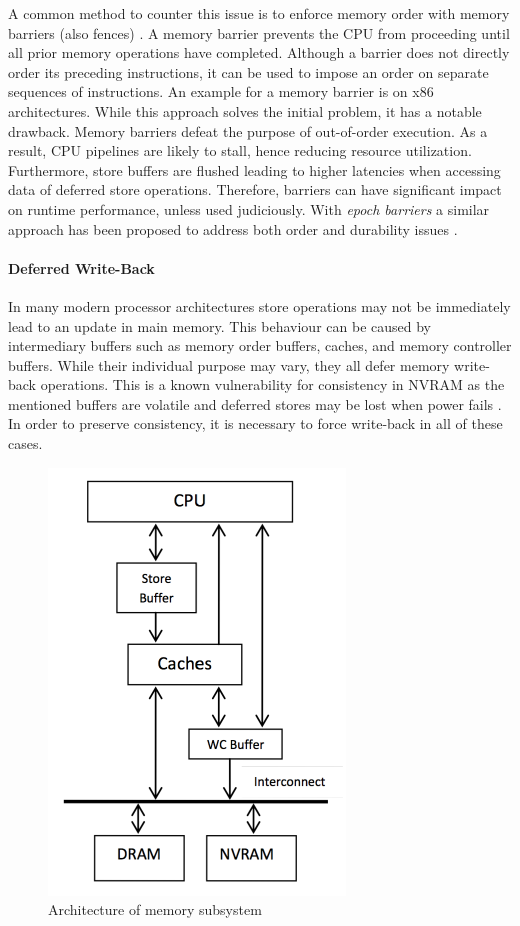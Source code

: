 A common method to counter this issue is to enforce memory order with memory
barriers (also fences) \cite{dulloor2014system, schwalb2016hyrise,
oukid2017data}. A memory barrier prevents the CPU from proceeding until all
prior memory operations have completed. Although a barrier does not directly
order its preceding instructions, it can be used to impose an order on separate
sequences of instructions. An example for a memory barrier is  on
x86 architectures. While this approach solves the initial problem, it has a
notable drawback. Memory barriers defeat the purpose of out-of-order execution.
As a result, CPU pipelines are likely to stall, hence reducing resource
utilization. Furthermore, store buffers are flushed leading to higher latencies
when accessing data of deferred store operations. Therefore, barriers can have
significant impact on runtime performance, unless used judiciously. With
\emph{epoch barriers} a similar approach has been proposed to address both order
and durability issues \cite{condit2009better}.

\paragraph{Deferred Write-Back}

In many modern processor architectures store operations may not  be immediately
lead to an update in main memory. This behaviour can be caused by intermediary
buffers such as memory order buffers, caches, and memory controller buffers.
While their individual purpose may vary, they all defer memory write-back
operations. This is a known vulnerability for consistency in NVRAM as the
mentioned buffers are volatile and deferred stores may be lost when power fails
\cite{condit2009better, oukid2017data}. In order to preserve consistency, it is
necessary to force write-back in all of these cases.

\begin{figure}[!ht]
    \centering
    \includegraphics[scale=0.75]{figures/nvram-memory-subsystem.pdf}
    \caption{Architecture of memory subsystem \cite{bhandari2012implications}}
    \label{fig:nvml}
\end{figure}

